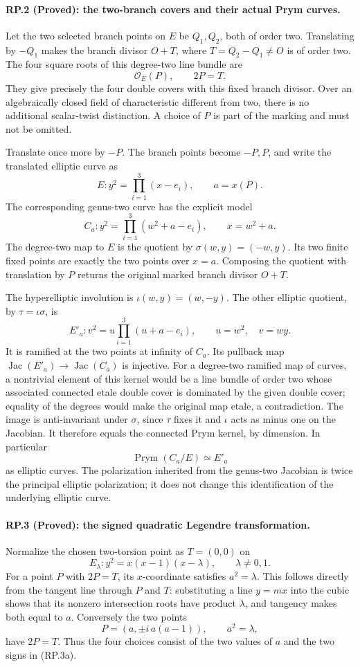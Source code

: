 \paragraph{RP.2 (Proved): the two-branch covers and their actual Prym curves.}
Let the two selected branch points on $E$ be $Q_1,Q_2$,
both of order two. Translating by $-Q_1$ makes the
branch divisor $O+T$, where $T=Q_2-Q_1\ne O$ is of
order two. The four square roots of this degree-two
line bundle are
\[
                \mathcal O_E(P),\qquad 2P=T.
 \tag{RP.2a}
\]
They give precisely the four double covers with this
fixed branch divisor. Over an algebraically closed
field of characteristic different from two, there is
no additional scalar-twist distinction. A choice of
$P$ is part of the marking and must not be omitted.

Translate once more by $-P$. The branch points become
$-P,P$, and write the translated elliptic curve as
\[
 E:y^2=\prod_{i=1}^3(x-e_i),\qquad a=x(P).
\]
The corresponding genus-two curve has the explicit model
\[
 C_a:y^2=\prod_{i=1}^3(w^2+a-e_i),\qquad x=w^2+a.
 \tag{RP.2b}
\]
The degree-two map to $E$ is the quotient by
$\sigma(w,y)=(-w,y)$. Its two finite fixed points
are exactly the two points over $x=a$. Composing
the quotient with translation by $P$ returns the
original marked branch divisor $O+T$.

The hyperelliptic involution is
$\iota(w,y)=(w,-y)$. The other elliptic quotient,
by $\tau=\iota\sigma$, is
\[
 E'_a:v^2=u\prod_{i=1}^3(u+a-e_i),\qquad
                       u=w^2,\quad v=wy.
 \tag{RP.2c}
\]
It is ramified at the two points at infinity of $C_a$.
Its pullback map $\operatorname{Jac}(E'_a)\to
\operatorname{Jac}(C_a)$ is injective. For a degree-two
ramified map of curves, a nontrivial element of this
kernel would be a line bundle of order two whose
associated connected etale double cover is dominated
by the given double cover; equality of the degrees
would make the original map etale, a contradiction.
The image is anti-invariant under $\sigma$, since
$\tau$ fixes it and $\iota$ acts as minus one on the
Jacobian. It therefore equals the connected Prym
kernel, by dimension. In particular
\[
           \operatorname{Prym}(C_a/E)\simeq E'_a
 \tag{RP.2d}
\]
as elliptic curves. The polarization inherited from
the genus-two Jacobian is twice the principal
elliptic polarization; it does not change this
identification of the underlying elliptic curve.

\paragraph{RP.3 (Proved): the signed quadratic Legendre transformation.}
Normalize the chosen two-torsion point as $T=(0,0)$ on
\[
       E_\lambda:y^2=x(x-1)(x-\lambda),\qquad
       \lambda\ne0,1.
\]
For a point $P$ with $2P=T$, its $x$-coordinate satisfies
$a^2=\lambda$. This follows directly from the tangent
line through $P$ and $T$: substituting a line $y=mx$
into the cubic shows that its nonzero intersection
roots have product $\lambda$, and tangency makes both
equal to $a$. Conversely the two points
\[
        P=(a,\pm i\,a(a-1)),\qquad a^2=\lambda,
 \tag{RP.3a}
\]
have $2P=T$. Thus the four choices consist of the two
values of $a$ and the two signs in (RP.3a).

